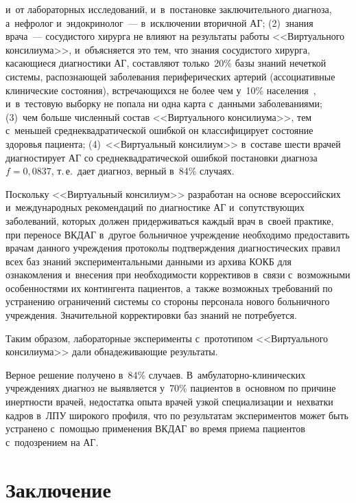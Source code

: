 \begin{multicols}{2}


\noindent
 и~от ла\-бораторных исследований, и~в~постановке
заключительного диагноза, а~нефролог и~эндокринолог~--- в~исключении вторичной 
АГ; (2)~знания врача~--- сосудистого хирурга не влияют на 
результаты работы <<Виртуального консилиума>>, и~объясняется это тем, что знания 
сосудистого хирурга, касающиеся диагностики АГ, составляют только~20\% базы знаний 
нечеткой системы, распознающей заболевания периферических артерий (ассоциативные 
клинические состояния), встречающихся не более чем у~10\% населения~\cite{11-kir}, 
и~в~тес\-то\-вую выборку не попала ни одна карта с~данными заболеваниями; (3)~чем больше 
численный состав <<Виртуального консилиума>>, тем с~меньшей среднеквадратической 
ошибкой он классифицирует состояние здоровья пациента; (4)~<<Виртуальный консилиум>> 
в~со\-ста\-ве шести врачей диагностирует АГ со среднеквадратической 
ошибкой постановки диагноза $f = 0{,}0837$, т.\,е.\ дает диагноз, верный в~84\% слу\-чаях. 
{

}
  
  Поскольку <<Виртуальный консилиум>> разра\-ботан на основе всероссийских~\cite{9-kir} 
и~между\-народных рекомендаций по диагностике АГ и~со\-пут\-ст\-ву\-ющих заболеваний, 
которых должен придерживать\-ся каж\-дый врач в~своей практике, при переносе \mbox{ВКДАГ} 
в~другое больничное учреж\-де\-ние необходимо пред\-оста\-вить врачам данного учреждения 
протоколы подтверждения диагностических правил всех баз знаний экспериментальными 
данными из архива КОКБ для ознакомления 
и~внесения при необходимости коррективов в~связи с~возможными особенностями их 
контингента пациентов, а~также возможных требований по устранению ограничений 
системы со стороны персонала нового больничного учреждения. Значительной 
корректировки баз знаний не потребуется.
  
  Таким образом, лабораторные эксперименты с~прототипом <<Виртуального 
консилиума>> дали обнадеживающие результаты. 

Верное решение получено в~84\% 
случаев. В~ам\-бу\-ла\-тор\-но-кли\-ни\-че\-ских учреждениях диагноз не 
выявляется у~70\% пациентов в~основном по причине инертности врачей, недостатка опыта 
врачей узкой специализации и~нехватки кадров в~ЛПУ
широкого профиля, что по результатам экспериментов может быть устранено с~по\-мощью 
применения \mbox{ВКДАГ} во время приема пациентов с~подозрением на АГ.

\section{Заключение}


\end{multicols}
